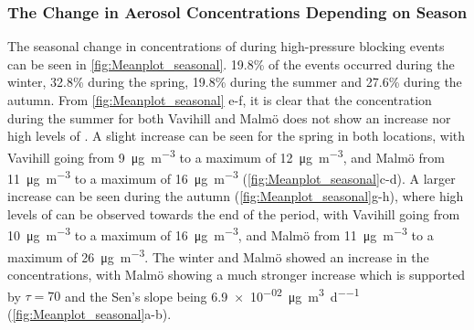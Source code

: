 \newpage 


\subsubsection{The Change in Aerosol Concentrations Depending on Season}
The seasonal change in concentrations of \PM during high-pressure blocking events can be seen in \autoref{fig:Meanplot_seasonal}. 19.8\% of the events occurred during the winter, 32.8\% during the spring, 19.8\% during the summer and 27.6\% during the autumn. From \autoref{fig:Meanplot_seasonal} e-f, it is clear that the concentration during the summer for both Vavihill and Malmö does not show an increase nor high levels of \PM. A slight increase can be seen for the spring in both locations, with Vavihill going from \SI{9}{\micro\gram\per\meter\cubed} to a maximum of \SI{12}{\micro\gram\per\meter\cubed}, and Malmö from \SI{11}{\micro\gram\per\meter\cubed} to a maximum of \SI{16}{\micro\gram\per\meter\cubed} (\autoref{fig:Meanplot_seasonal}c-d). A larger increase can be seen during the autumn (\autoref{fig:Meanplot_seasonal}g-h), where high levels of \PM can be observed towards the end of the period, with Vavihill going from \SI{10}{\micro\gram\per\meter\cubed} to a maximum of \SI{16}{\micro\gram\per\meter\cubed}, and Malmö from \SI{11}{\micro\gram\per\meter\cubed} to a maximum of \SI{26}{\micro\gram\per\meter\cubed}. The winter and Malmö showed an increase in the \PM concentrations, with Malmö showing a much stronger increase which is supported by $\tau=70$ and the Sen's slope being \SI{6.9e-02}{\micro\gram\per\meter\cubed\per\day} (\autoref{fig:Meanplot_seasonal}a-b). 

